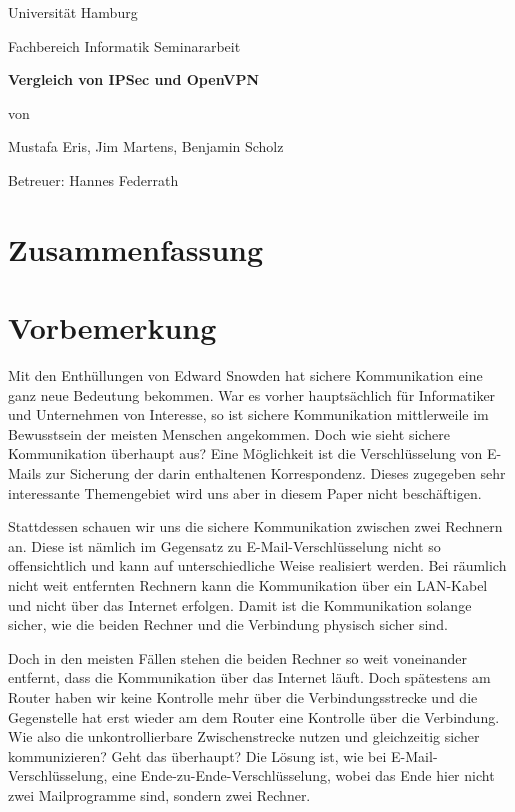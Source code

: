 \documentclass[12pt]{scrartcl}
\begin{document}

\newpage
\thispagestyle{empty}
\begin{center}\Large
Universität Hamburg \par
Fachbereich Informatik
\vfill
Seminararbeit
\vfill
{\Large\textsf{\textbf{Vergleich von IPSec und OpenVPN}}\par}
\vfill
von 
\par\bigskip
Mustafa Eris, Jim Martens, Benjamin Scholz \par
Betreuer: Hannes Federrath \par
\end{center}

\newpage
\section*{Zusammenfassung}


\newpage
\tableofcontents

\newpage
\section{Vorbemerkung}
Mit den Enthüllungen von Edward Snowden hat sichere Kommunikation eine ganz neue Bedeutung bekommen. War es vorher hauptsächlich für Informatiker und Unternehmen von Interesse, so ist sichere Kommunikation mittlerweile im Bewusstsein der meisten Menschen angekommen. Doch wie sieht sichere Kommunikation überhaupt aus? Eine Möglichkeit ist die Verschlüsselung von E-Mails zur Sicherung der darin enthaltenen Korrespondenz. Dieses zugegeben sehr interessante Themengebiet wird uns aber in diesem Paper nicht beschäftigen. 

Stattdessen schauen wir uns die sichere Kommunikation zwischen zwei Rechnern an. Diese ist nämlich im Gegensatz zu E-Mail-Verschlüsselung nicht so offensichtlich und kann auf unterschiedliche Weise realisiert werden. Bei räumlich nicht weit entfernten Rechnern kann die Kommunikation über ein LAN-Kabel und nicht über das Internet erfolgen. Damit ist die Kommunikation solange sicher, wie die beiden Rechner und die Verbindung physisch sicher sind. 

Doch in den meisten Fällen stehen die beiden Rechner so weit voneinander entfernt, dass die Kommunikation über das Internet läuft. Doch spätestens am Router haben wir keine Kontrolle mehr über die Verbindungsstrecke und die Gegenstelle hat erst wieder am dem Router eine Kontrolle über die Verbindung. Wie also die unkontrollierbare Zwischenstrecke nutzen und gleichzeitig sicher kommunizieren? Geht das überhaupt? Die Lösung ist, wie bei E-Mail-Verschlüsselung, eine Ende-zu-Ende-Verschlüsselung, wobei das Ende hier nicht zwei Mailprogramme sind, sondern zwei Rechner.
\end{document}
